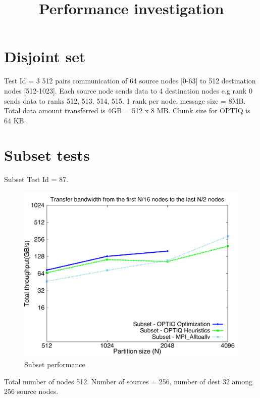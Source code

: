 \documentclass[letter]{article}
\title{Performance investigation}
\begin{document}
\maketitle

\section{Disjoint set}

Test Id = 3 512 pairs communication of 64 source nodes [0-63] to 512 destination nodes [512-1023]. Each source node sends data to 4 destination nodes e.g rank 0 sends data to ranks 512, 513, 514, 515. 1 rank per node, message size = 8MB. Total data amount transferred is 4GB = 512 x 8 MB. Chunk size for OPTIQ is 64 KB.

\section{Subset tests}

Subset Test Id = 87. 

\begin{figure}[!htb]
\vspace{-0.1in}
\centering
\includegraphics[scale=0.30]{report_figures/constantr_subset.pdf}
\vspace{-0.1in}
\caption{Subset performance}
\vspace{-0.1in}
\label{fig:patterns}
\end{figure}

Total number of nodes 512. Number of sources = 256, number of dest 32 among 256 source nodes.
\end{document}
